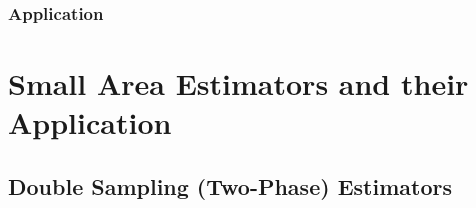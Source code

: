 \documentclass[article]{jss}
\newcommand{\var}{\mathbb{V}}
\begin{document}
\subsubsection{Application}



% 
% 







































\section[Small Area Estimators and their Application in R]{Small Area Estimators and their Application}
\label{sec:saeest_and_appl}


\subsection{Double Sampling (Two-Phase) Estimators}

%
%
\end{document}
